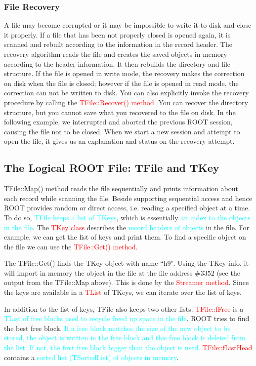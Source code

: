 \documentclass[12pt,a4paper]{article}
\begin{document}
\subsubsection{File Recovery}
A file may become corrupted or it may be impossible to write it to disk and close it properly. If a file that has been not properly closed is opened again, it is scanned and rebuilt according to the information in the record header. The recovery algorithm reads the file and creates the saved objects in memory according to the header information. It then rebuilds the directory and file structure. If the file is opened in write mode, the recovery makes the correction on disk when the file is closed; however if the file is opened in read mode, the correction can not be written to disk. You can also explicitly invoke the recovery procedure by calling the \textcolor{red}{TFile::Recover() method}. You can recover the directory structure, but you cannot save what you recovered to the file on disk. In the following example, we interrupted and aborted the previous ROOT session, causing the file not to be closed. When we start a new session and attempt to open the file, it gives us an explanation and status on the recovery attempt. 

\subsection{The Logical ROOT File: TFile and TKey}
TFile::Map() method reads the file sequentially and prints information about each record while scanning the file. Beside supporting sequential access and hence ROOT provides random or direct access, i.e. reading a specified object at a time. To do so, \textcolor{cyan}{TFile keeps a list of TKeys}, which is essentially \textcolor{cyan}{an index to the objects in the file}. The \textcolor{red}{TKey class} describes the \textcolor{cyan}{record headers of objects} in the file. For example, we can get the list of keys and print them. To find a specific object on the file we can use the \textcolor{red}{TFile::Get() method}.

The TFile::Get() finds the TKey object with name ``h9". Using the TKey info, it will import in memory the object in the file at the file address $\#3352$ (see the output from the TFile::Map above). This is done by the \textcolor{red}{Streamer method}. Since the keys are available in a \textcolor{red}{TList} of TKeys, we can iterate over the list of keys.

In addition to the list of keys, TFile also keeps two other lists: \textcolor{red}{TFile::fFree} is a \textcolor{cyan}{TList of free blocks used to recycle freed up space in the file}. ROOT tries to find the best free block. \textcolor{cyan}{If a free block matches the size of the new object to be stored, the object is written in the free block and this free block is deleted from the list. If not, the first free block bigger than the object is used.} \textcolor{red}{TFile::fListHead} contains a \textcolor{cyan}{sorted list (TSortedList) of objects in memory}. 
\end{document}
